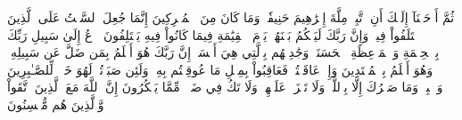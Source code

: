 ثُمَّ أَوۡحَيۡنَآ إِلَيۡكَ أَنِ ٱتَّبِعۡ مِلَّةَ إِبۡرَٰهِيمَ حَنِيفٗاۖ وَمَا كَانَ مِنَ ٱلۡمُشۡرِكِينَ
إِنَّمَا جُعِلَ ٱلسَّبۡتُ عَلَى ٱلَّذِينَ ٱخۡتَلَفُواْ فِيهِۚ وَإِنَّ رَبَّكَ لَيَحۡكُمُ بَيۡنَهُمۡ يَوۡمَ ٱلۡقِيَٰمَةِ فِيمَا كَانُواْ فِيهِ يَخۡتَلِفُونَ
ٱدۡعُ إِلَىٰ سَبِيلِ رَبِّكَ بِٱلۡحِكۡمَةِ وَٱلۡمَوۡعِظَةِ ٱلۡحَسَنَةِۖ وَجَٰدِلۡهُم بِٱلَّتِي هِيَ أَحۡسَنُۚ إِنَّ رَبَّكَ هُوَ أَعۡلَمُ بِمَن ضَلَّ عَن سَبِيلِهِۦ وَهُوَ أَعۡلَمُ بِٱلۡمُهۡتَدِينَ
وَإِنۡ عَاقَبۡتُمۡ فَعَاقِبُواْ بِمِثۡلِ مَا عُوقِبۡتُم بِهِۦۖ وَلَئِن صَبَرۡتُمۡ لَهُوَ خَيۡرٞ لِّلصَّـٰبِرِينَ
وَٱصۡبِرۡ وَمَا صَبۡرُكَ إِلَّا بِٱللَّهِۚ وَلَا تَحۡزَنۡ عَلَيۡهِمۡ وَلَا تَكُ فِي ضَيۡقٖ مِّمَّا يَمۡكُرُونَ
إِنَّ ٱللَّهَ مَعَ ٱلَّذِينَ ٱتَّقَواْ وَّٱلَّذِينَ هُم مُّحۡسِنُونَ